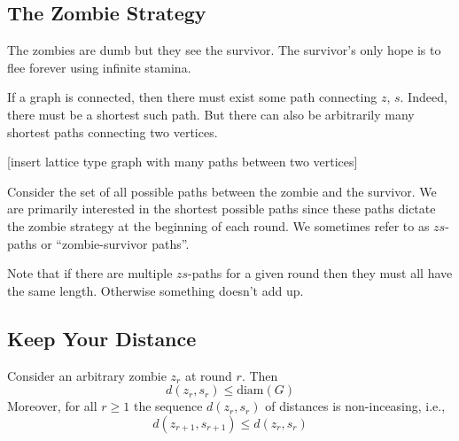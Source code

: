\subsection{The Zombie Strategy}
The zombies are dumb but they see the survivor.
The survivor's only hope is to flee forever using infinite stamina.

If a graph is connected, then there must exist some path connecting $z$, $s$.
Indeed, there must be a shortest such path.
But there can also be arbitrarily many shortest paths connecting two vertices.

[insert lattice type graph with many paths between two vertices]

Consider the set of all possible paths between the zombie and the survivor.
We are primarily interested in the shortest possible paths since these
paths dictate the zombie strategy at the beginning of each round. We sometimes
refer to as $zs$-paths or ``zombie-survivor paths''.

Note that if there are multiple $zs$-paths for a given round then they must all have
the same length. Otherwise something doesn't add up.


\subsection{Keep Your Distance}

\begin{lemma}

  Consider an arbitrary zombie $z_r$ at round $r$.
  Then
  \[d(z_r, s_r) \leq \text{diam}(G) \]
  Moreover, for all $r \geq 1$ the sequence $d(z_r, s_r)$ of distances is non-inceasing, i.e.,
  \[ d(z_{r+1}, s_{r+1}) \leq d(z_r, s_r)\]
\end{lemma}

